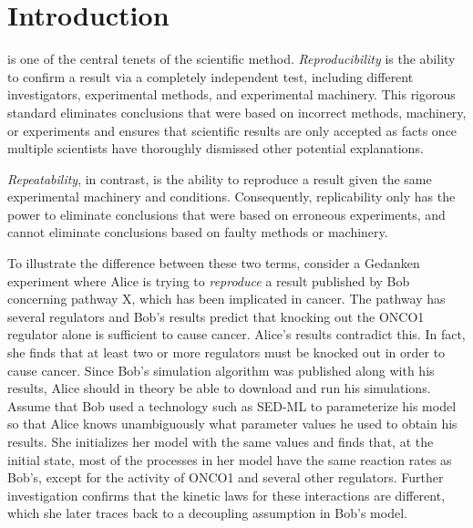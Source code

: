 \documentclass[journal,transmag,twoside]{IEEEtran}
\begin{document}
\section{Introduction}
% 
% 
% 
% 
 is one of the central tenets of the scientific method.
\textit{Reproducibility} is the ability to confirm a result via a completely independent test, including different investigators, experimental methods, and experimental machinery. 
This rigorous standard eliminates conclusions that were based on incorrect methods, machinery, or experiments and ensures that scientific results are only accepted as facts once multiple scientists have thoroughly dismissed other potential explanations. 

\textit{Repeatability}, in contrast, is the ability to reproduce a result given the same experimental machinery and conditions.
Consequently, replicability only has the power to eliminate conclusions that were based on erroneous experiments, and cannot eliminate conclusions based on faulty methods or machinery.

To illustrate the difference between these two terms, consider a Gedanken experiment where Alice is trying to \textit{reproduce} a result published by Bob concerning pathway X, which has been implicated in cancer. The pathway has several regulators and Bob's results predict that knocking out the ONCO1 regulator alone is sufficient to cause cancer. Alice's results contradict this. In fact, she finds that at least two or more regulators must be knocked out in order to cause cancer. Since Bob's simulation algorithm was published along with his results, Alice should in theory be able to download and run his simulations. Assume that Bob used a technology such as SED-ML \cite{sedml2011} to parameterize his model so that Alice knows unambiguously what parameter values he used to obtain his results. She initializes her model with the same values and finds that, at the initial state, most of the processes in her model have the same reaction rates as Bob's, except for the activity of ONCO1 and several other regulators. Further investigation confirms that the kinetic laws for these interactions are different, which she later traces back to a decoupling assumption in Bob's model.
\end{document}
